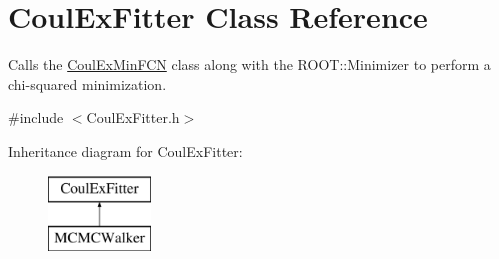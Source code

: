 \hypertarget{classCoulExFitter}{\section{Coul\-Ex\-Fitter Class Reference}
\label{classCoulExFitter}
}


Calls the \hyperlink{classCoulExMinFCN}{Coul\-Ex\-Min\-F\-C\-N} class along with the R\-O\-O\-T\-::\-Minimizer to perform a chi-\/squared minimization.  




{\ttfamily \#include $<$Coul\-Ex\-Fitter.\-h$>$}

Inheritance diagram for Coul\-Ex\-Fitter\-:\begin{figure}[H]
\begin{center}
\leavevmode
\includegraphics[height=2.000000cm]{classCoulExFitter}
\end{center}
\end{figure}
